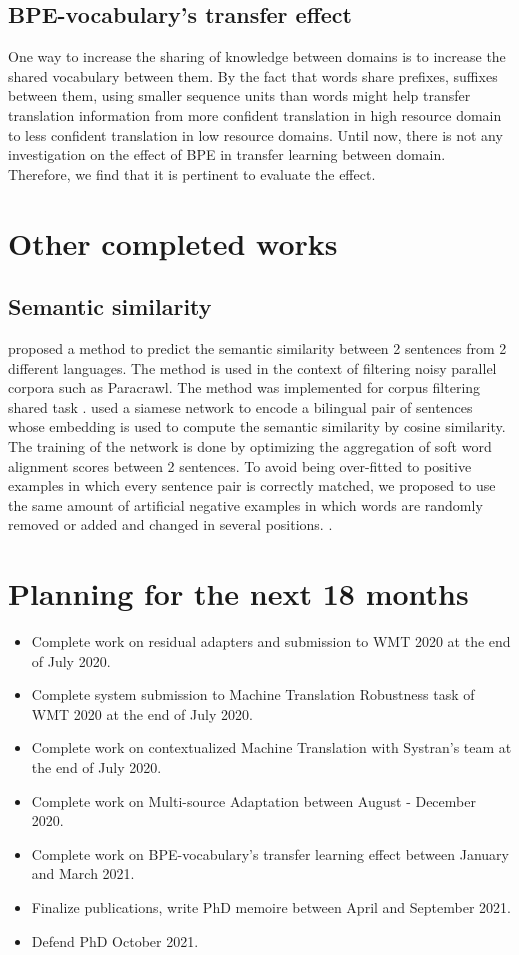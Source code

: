 \documentclass[12pt,a4paper,twoside]{report}
\theoremstyle{definition}
\begin{document}
\subsection*{BPE-vocabulary's transfer effect}
One way to increase the sharing of knowledge between domains is to increase the shared vocabulary between them. By the fact that words share prefixes, suffixes between them, using smaller sequence units than words might help transfer translation information from more confident translation in high resource domain to less confident translation in low resource domains. Until now, there is not any investigation on the effect of BPE in transfer learning between domain. Therefore, we find that it is pertinent to evaluate the effect.

\section*{Other completed works}

\subsection*{Semantic similarity}
\cite{pham18fixing} proposed a method to predict the semantic similarity between 2 sentences from 2 different languages. The method is used in the context of filtering noisy parallel corpora such as Paracrawl. The method was implemented for corpus filtering shared task  \cite{koehn18findings}. \cite{pham18fixing} used a siamese network to encode a bilingual pair of sentences whose embedding is used to compute the semantic similarity by cosine similarity. The training of the network is done by optimizing the aggregation of soft word alignment scores between 2 sentences. To avoid being over-fitted to positive examples in which every sentence pair is correctly matched, we proposed to use the same amount of artificial negative examples in which words are randomly removed or added and changed in several positions. 
.
\section*{Planning for the next 18 months}

\begin{itemize}
\item Complete work on residual adapters and submission to WMT 2020 at the end of July 2020.
\item Complete system submission to Machine Translation Robustness task of WMT 2020 at the end of July 2020.
\item Complete work on contextualized Machine Translation with Systran's team at the end of July 2020.
\item Complete  work on Multi-source Adaptation between August - December 2020.
\item Complete work on BPE-vocabulary's transfer learning effect between January and March 2021.
\item Finalize publications, write PhD memoire between April and September 2021.
\item Defend PhD October 2021.
\end{itemize}



\end{document}
